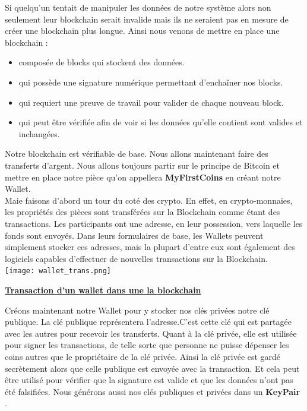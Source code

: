 \documentclass[12pt]{report}
\begin{document}
\hspace{1cm} Si quelqu'un tentait de manipuler les données de notre système alors non seulement leur blockchain serait invalide mais ils ne seraient pas en mesure de créer une blockchain plus longue. Ainsi nous venons de mettre en place une blockchain : 
\begin{itemize}
    \item composée de blocks qui stockent des données. 
    \item qui possède une signature numérique permettant d'enchaîner nos blocks. 
    \item qui requiert une preuve de travail pour valider de chaque nouveau block.
    \item qui peut être vérifiée afin de voir si les données qu'elle contient sont valides et inchangées.
\end{itemize}

\hspace{1cm} Notre blockchain est vérifiable de base. Nous allons maintenant faire des transferts d'argent. Nous allons toujours partir sur le principe de Bitcoin et mettre en place notre pièce qu'on appellera \textbf{MyFirstCoins} en créant notre Wallet. \\
Maie faisons d'abord un tour du coté des crypto. En effet, en crypto-monnaies, les propriétés des pièces sont transférées sur la Blockchain comme étant des transactions. Les participants ont une adresse, en leur possession, vers laquelle les fonds sont envoyés. Dans leurs formulaires de base, les Wallets peuvent simplement stocker ces adresses, mais la plupart d'entre eux sont également des logiciels capables d'effectuer de nouvelles transactions sur la Blockchain.\\

\texttt{[image: wallet\_trans.png]}
\begin{center}
     \textbf{\underline{Transaction d'un wallet dans une la blockchain}} \\[1cm]
\end{center}


Créons maintenant notre Wallet pour y stocker nos clés privées notre clé publique.  
\hspace{1cm} La clé publique représentera l’adresse.C'est cette clé qui est partagée avec les autres pour recevoir les transferts. Quant à la clé privée, elle est utilisée pour signer les transactions, de telle sorte que personne ne puisse dépenser les coins autres que le propriétaire de la clé privée. Ainsi la clé privée est gardé secrètement alors que celle publique est envoyée avec la transaction. Et cela peut être utilisé pour vérifier que la signature est valide et que les données n'ont pas été falsifiées. Nous générons aussi nos clés publiques et privées dans un \textbf{KeyPair} .
\end{document}
